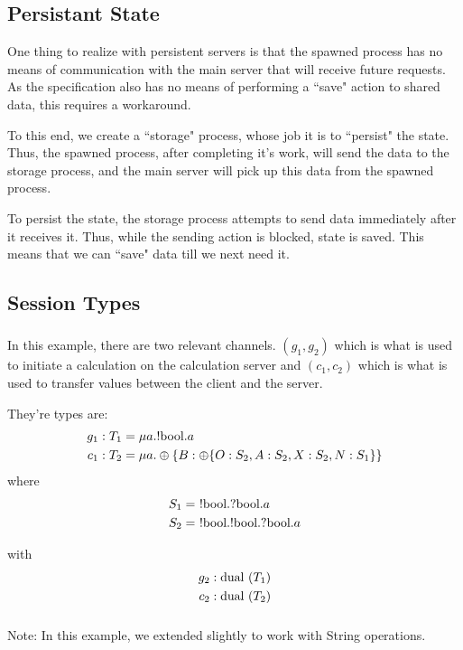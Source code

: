 \subsection{Persistant State}
One thing to realize with persistent servers is that the spawned process has no means of communication with the main server that will receive future requests. As the specification also has no means of performing a ``save" action to shared data, this requires a workaround.

To this end, we create a ``storage" process, whose job it is to ``persist" the state. Thus, the spawned process, after completing it's work, will send the data to the storage process, and the main server will pick up this data from the spawned process.

To persist the state, the storage process attempts to send data immediately after it receives it. Thus, while the sending action is blocked, state is saved. This means that we can ``save" data till we next need it.

\subsection{Session Types}
\subsubsection{}
In this example, there are two relevant channels. $(g_1,g_2)$ which is what is used to initiate a calculation on the calculation server and $(c_1,c_2)$ which is what is used to transfer values between the client and the server.

They're types are:
\begin{align*}
g_1 &: T_1 = \mu a . ! \text{bool} . a\\
c_1 &: T_2 = \mu a. \oplus \{B : \oplus \{O : S_2, A : S_2, X : S_2, N : S_1\}\}
\end{align*}
where
\begin{align*}
S_1 &=\ ! \text{bool} . ? \text{bool} . a \\
S_2 &=\ ! \text{bool} . ! \text{bool} . ? \text{bool} . a
\end{align*}

with
\begin{align*}
g_2 &: \text{dual }(T_1)\\
c_2 &: \text{dual }(T_2)
\end{align*}

\subsubsection{}
Note: In this example, we extended  slightly to work with String operations.

